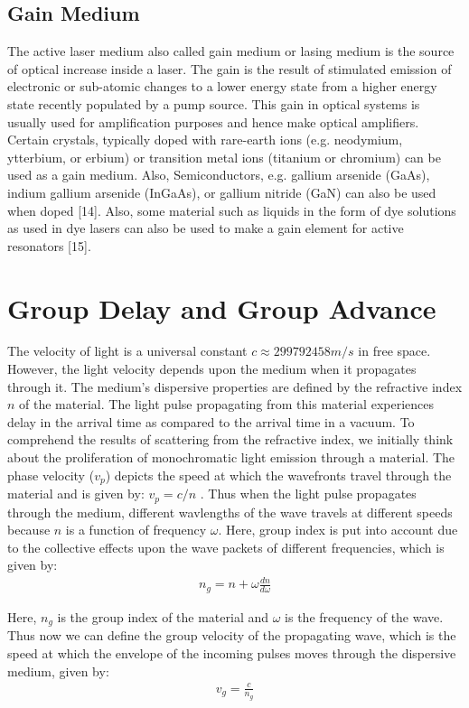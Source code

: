 \subsection{Gain Medium}
The active laser medium also called gain medium or lasing medium is the source of optical increase inside a laser. The gain is the result of stimulated emission of electronic or sub-atomic changes to a lower energy state from a higher energy state recently populated by a pump source. This gain in optical systems is usually used for amplification purposes and hence make optical amplifiers. Certain crystals, typically doped with rare-earth ions (e.g. neodymium, ytterbium, or erbium) or transition metal ions (titanium or chromium) can be used as a gain medium. Also, Semiconductors, e.g. gallium arsenide (GaAs), indium gallium arsenide (InGaAs), or gallium nitride (GaN) can also be used when doped [14]. Also, some material such as liquids in the form of dye solutions as used in dye lasers can also be used to make a gain element for active resonators [15].


\section{Group Delay and Group Advance}
The velocity of light is a universal constant $c \approx 299792458 m/s$ in free space. However, the light velocity depends upon the medium when it propagates through it. The medium's dispersive properties are defined by the refractive index $n$ of the material. The light pulse propagating from this material experiences delay in the arrival time as compared to the arrival time in a vacuum. 
To comprehend the results of scattering from the refractive index, we initially think about the proliferation of monochromatic light emission through a material. The phase velocity ($v_{p}$) depicts the speed at which the wavefronts travel through the material and is given by: $v_{p} = c/n $ . Thus when the light pulse propagates through the medium, different wavlengths of the wave travels at different speeds because $n$ is a function of frequency $\omega$. Here, group index is put into account due to the collective effects upon the wave packets of different frequencies, which is given by:
\begin{align*}
n_{g} = n + \omega\frac{dn}{d\omega}
\end{align*}

Here, $n_{g}$ is the group index of the material and $\omega$ is the frequency of the wave. Thus now we can define the group velocity of the propagating wave, which is the speed at which the envelope of the incoming pulses moves through the dispersive medium, given by:
\begin{align*}
v_{g} = \frac{c}{n_{g}}
\end{align*}

